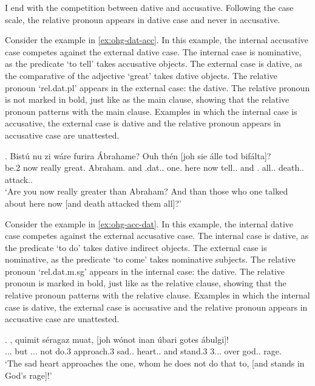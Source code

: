 I end with the competition between dative and accusative. Following the case scale, the relative pronoun appears in dative case and never in accusative.

Consider the example in \ref{ex:ohg-dat-acc}. In this example, the internal accusative case competes against the external dative case.
The internal case is nominative, as the predicate  `to tell' takes accusative objects.
The external case is dative, as the comparative of the adjective  `great' takes dative objects.
The relative pronoun  `\ac{rel}.\ac{dat}.\ac{pl}' appears in the external case: the dative. The relative pronoun is not marked in bold, just like as the main clause, showing that the relative pronoun patterns with the main clause.
Examples in which the internal case is accusative, the external case is dative and the relative pronoun appears in accusative case are unattested.

\exg. Bistú nu {zi wáre} furira Ábrahame? Ouh thén     [joh sie álle tod bifálta]?\\
{be.2 } now really {great}.\scsub{[dat]} Abraham. and .\ac{dat}.. one. here now tell..\scsub{[acc]}
and . all.. death.. attack..\\
`Are you now really greater than Abraham? And than those who one talked about here now [and death attacked them all]?' \label{ex:ohg-dat-acc}

Consider the example in \ref{ex:ohg-acc-dat}. In this example, the internal dative case competes against the external accusative case.
The internal case is dative, as the predicate  `to do' takes dative indirect objects.
The external case is nominative, as the predicate  `to come' takes nominative subjects.
The relative pronoun  `\ac{rel}.\ac{dat}.\ac{m}.\ac{sg}' appears in the internal case: the dative. The relative pronoun is marked in bold, just like as the relative clause, showing that the relative pronoun patterns with the relative clause.
Examples in which the internal case is dative, the external case is accusative and the relative pronoun appears in accusative case are unattested.

\exg.     , quimit séragaz muat, [joh wónot inan úbari gotes ábulgi]!\\
... but ... not do.3\scsub{[dat]} approach.3\scsub{[acc]} sad.. heart..
and {stand}.3 3... over god.. rage.\\
`The sad heart approaches the one, whom he does not do that to, [and stands in God's rage]!' \label{ex:ohg-acc-dat}

